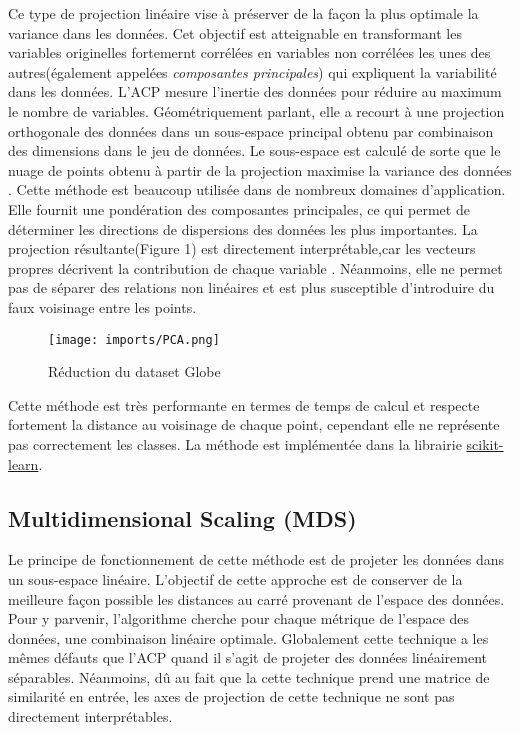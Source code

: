 Ce type de projection linéaire vise à préserver de la façon la plus optimale la variance dans les données. Cet objectif est atteignable en transformant les variables originelles fortemernt corrélées en variables non corrélées les unes des autres(également appelées \textit{composantes principales}) qui expliquent la variabilité dans les données.
L’ACP mesure l’inertie des données pour réduire au maximum le nombre de variables. 
Géométriquement parlant, elle a recourt à une projection orthogonale des données dans un sous-espace principal obtenu par combinaison des dimensions dans le jeu de données. Le sous-espace est calculé de sorte que le nuage de points obtenu à partir de la projection maximise la variance des données \cite{HeulotThese}.\newline
Cette méthode est beaucoup utilisée dans de nombreux domaines d’application. Elle fournit une pondération des composantes principales, ce qui permet de déterminer les directions de dispersions des données les plus importantes.
La projection résultante(Figure 1) est directement interprétable,car les vecteurs propres décrivent la contribution de chaque variable \cite{HeulotThese}.
Néanmoins, elle ne permet pas de séparer des relations non linéaires et est plus susceptible d’introduire du faux voisinage entre les points.

\begin{center}
    \begin{figure}[ht!]
        \centering
        
        \texttt{[image: imports/PCA.png]}
        
        \caption{Réduction du dataset Globe}
    \end{figure}
\end{center}

Cette méthode est très performante en termes de temps de calcul et respecte fortement la distance au voisinage de chaque point, cependant elle ne représente pas correctement les classes.
\smallskip
La méthode est implémentée dans la librairie \href{https://scikit-learn.org/stable/modules/generated/sklearn.decomposition.PCA.html}{scikit-learn}.

\subsection{Multidimensional Scaling (MDS)}

Le principe de fonctionnement de cette méthode est de projeter les données dans un sous-espace linéaire\cite{abdi2007-MDS}. L'objectif de cette approche est de conserver de la meilleure façon possible les distances au carré provenant de l’espace des données. 
Pour y parvenir, l'algorithme cherche pour chaque métrique de l'espace des données, une combinaison linéaire optimale. Globalement cette technique a les mêmes défauts que l’ACP quand il s’agit de projeter des données linéairement séparables.
Néanmoins, dû au fait que la cette technique prend une matrice de similarité en entrée, les axes de projection de cette technique ne sont pas directement interprétables\cite{HeulotThese}.

